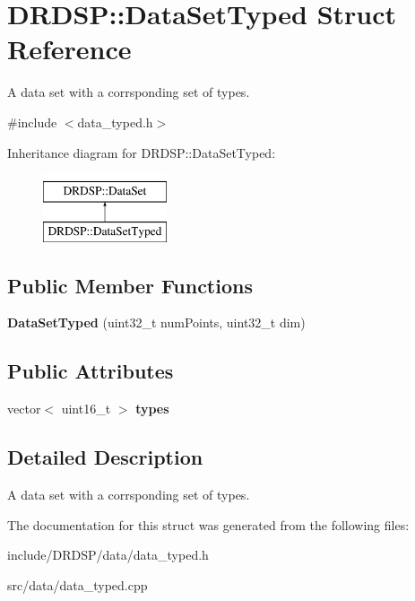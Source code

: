\hypertarget{struct_d_r_d_s_p_1_1_data_set_typed}{\section{D\-R\-D\-S\-P\-:\-:Data\-Set\-Typed Struct Reference}
\label{struct_d_r_d_s_p_1_1_data_set_typed}
}


A data set with a corrsponding set of types.  




{\ttfamily \#include $<$data\-\_\-typed.\-h$>$}

Inheritance diagram for D\-R\-D\-S\-P\-:\-:Data\-Set\-Typed\-:\begin{figure}[H]
\begin{center}
\leavevmode
\includegraphics[height=2.000000cm]{struct_d_r_d_s_p_1_1_data_set_typed}
\end{center}
\end{figure}
\subsection*{Public Member Functions}
\begin{DoxyCompactItemize}
\item 
\hypertarget{struct_d_r_d_s_p_1_1_data_set_typed_a2c0d17460e6b0ad3db11626ee8c54c5a}{{\bfseries Data\-Set\-Typed} (uint32\-\_\-t num\-Points, uint32\-\_\-t dim)}\label{struct_d_r_d_s_p_1_1_data_set_typed_a2c0d17460e6b0ad3db11626ee8c54c5a}

\end{DoxyCompactItemize}
\subsection*{Public Attributes}
\begin{DoxyCompactItemize}
\item 
\hypertarget{struct_d_r_d_s_p_1_1_data_set_typed_a5694d79a99492b42bc14f7e57a6550c7}{vector$<$ uint16\-\_\-t $>$ {\bfseries types}}\label{struct_d_r_d_s_p_1_1_data_set_typed_a5694d79a99492b42bc14f7e57a6550c7}

\end{DoxyCompactItemize}


\subsection{Detailed Description}
A data set with a corrsponding set of types. 

The documentation for this struct was generated from the following files\-:\begin{DoxyCompactItemize}
\item 
include/\-D\-R\-D\-S\-P/data/data\-\_\-typed.\-h\item 
src/data/data\-\_\-typed.\-cpp\end{DoxyCompactItemize}
